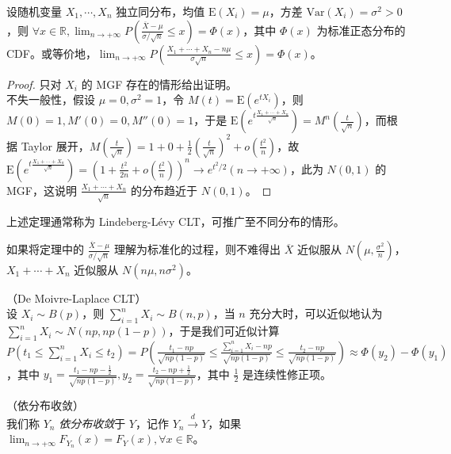 \documentclass[../main.tex]{subfiles}
\begin{document}
\begin{theorem}\label{thm:5.3.1}
    设随机变量 $X_1,\cdots,X_n$ 独立同分布，均值 $\mathrm E(X_i)=\mu$，方差 $\mathrm{Var}(X_i)=\sigma^2>0$，则 $\forall x\in\mathbb R,\lim_{n\rightarrow+\infty}P\left(\frac{\overline X-\mu}{\sigma/\sqrt n}\leq x\right)=\Phi(x)$，其中 $\Phi(x)$ 为标准正态分布的 CDF。或等价地，$\lim_{n\rightarrow+\infty}P\left(\frac{X_1+\cdots+X_n-n\mu}{\sigma\sqrt n}\leq x\right)=\Phi(x)$。
\end{theorem}

\begin{proof}
    只对 $X_i$ 的 MGF 存在的情形给出证明。\\
    不失一般性，假设 $\mu=0,\sigma^2=1$，令 $M(t)=\mathrm E(e^{tX_i})$，则 $M(0)=1,M'(0)=0,M''(0)=1$，于是 $\mathrm E(e^{t\frac{X_1+\cdots+X_n}{\sqrt n}})=M^n\left(\frac t{\sqrt n}\right)$，而根据 Taylor 展开，$M\left(\frac t{\sqrt n}\right)=1+0+\frac12\left(\frac t{\sqrt n}\right)^2+o\left(\frac{t^2}n\right)$，故 $\mathrm E(e^{t\frac{X_1+\cdots+X_n}{\sqrt n}})=(1+\frac{t^2}{2n}+o(\frac{t^2} n))^n\rightarrow e^{t^2/2}(n\rightarrow+\infty)$，此为 $N(0,1)$ 的 MGF，这说明 $\frac{X_1+\cdots+X_n}{\sqrt n}$ 的分布趋近于 $N(0,1)$。
\end{proof}

上述定理通常称为 Lindeberg-Lévy CLT，可推广至不同分布的情形。

如果将定理中的 $\frac{\overline X-\mu}{\sigma/\sqrt n}$ 理解为标准化的过程，则不难得出 $\overline X$ 近似服从 $N(\mu,\frac{\sigma^2}n)$，$X_1+\cdots+X_n$ 近似服从 $N(n\mu,n\sigma^2)$。

\begin{example}
    （De Moivre-Laplace CLT）\\
    设 $X_i\sim B(p)$，则 $\sum_{i=1}^nX_i\sim B(n,p)$，当 $n$ 充分大时，可以近似地认为 $\sum_{i=1}^nX_i\sim N(np,np(1-p))$，于是我们可近似计算 $P(t_1\leq \sum_{i=1}^nX_i\leq t_2)=P\left(\frac{t_1-np}{\sqrt{np(1-p)}}\leq\frac{\sum_{i=1}^nX_i-np}{\sqrt{np(1-p)}}\leq\frac{t_2-np}{\sqrt{np(1-p)}}\right)\approx \Phi(y_2)-\Phi(y_1)$，其中 $y_1=\frac{t_1-np-\frac12}{\sqrt{np(1-p)}},y_2=\frac{t_2-np+\frac12}{\sqrt{np(1-p)}}$，其中 $\frac12$ 是连续性修正项。
\end{example}

\begin{definition}\label{def:5.3.1}
    （依分布收敛）\\
    我们称 $Y_n$ \emph{依分布收敛}于 $Y$，记作 $Y_n\overset{d}{\rightarrow}Y$，如果 $\lim_{n\rightarrow+\infty}F_{Y_n}(x)=F_Y(x),\forall x\in\mathbb R$。
\end{definition}
\end{document}
